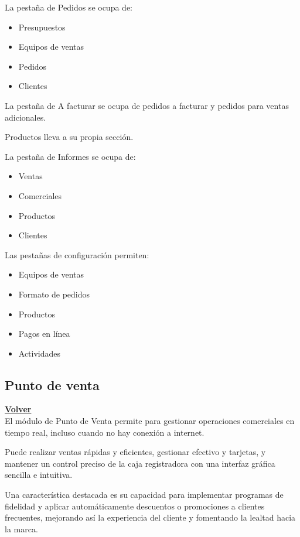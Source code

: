 \documentclass[a4paper,12pt]{article}
\begin{document}
\clearpage

La pestaña de Pedidos se ocupa de:
\begin{itemize}
    \item Presupuestos
    \item Equipos de ventas
    \item Pedidos
    \item Clientes
\end{itemize}

La pestaña de A facturar se ocupa de pedidos a facturar y pedidos para ventas adicionales.

Productos lleva a su propia sección.

La pestaña de Informes se ocupa de:
\begin{itemize}
    \item Ventas
    \item Comerciales
    \item Productos
    \item Clientes
\end{itemize}

Las pestañas de configuración permiten:
\begin{itemize}
    \item Equipos de ventas
    \item Formato de pedidos
    \item Productos
    \item Pagos en línea
    \item Actividades
\end{itemize}

\clearpage

\subsection{Punto de venta}
\hyperlink{anchor-indice}{\textbf{Volver}}\\

El módulo de Punto de Venta permite para gestionar operaciones comerciales en tiempo real, incluso cuando no hay conexión a internet.

Puede realizar ventas rápidas y eficientes, gestionar efectivo y tarjetas, y mantener un control preciso de la caja registradora con una interfaz gráfica sencilla e intuitiva.

Una característica destacada es su capacidad para implementar programas de fidelidad y aplicar automáticamente descuentos o promociones a clientes frecuentes, mejorando así la experiencia del cliente y fomentando la lealtad hacia la marca.
\end{document}
